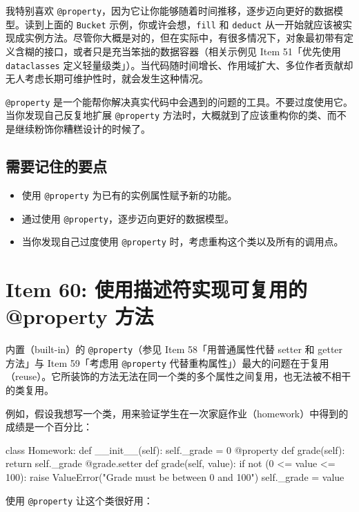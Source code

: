 我特别喜欢 \texttt{@property}，因为它让你能够随着时间推移，逐步迈向更好的数据模型。读到上面的 \texttt{Bucket} 示例，你或许会想，\texttt{fill} 和 \texttt{deduct} 从一开始就应该被实现成实例方法。尽管你大概是对的，但在实际中，有很多情况下，对象最初带有定义含糊的接口，或者只是充当笨拙的数据容器（相关示例见 Item 51「优先使用 \texttt{dataclasses} 定义轻量级类」）。当代码随时间增长、作用域扩大、多位作者贡献却无人考虑长期可维护性时，就会发生这种情况。

\texttt{@property} 是一个能帮你解决真实代码中会遇到的问题的工具。不要过度使用它。当你发现自己反复地扩展 \texttt{@property} 方法时，大概就到了应该重构你的类、而不是继续粉饰你糟糕设计的时候了。

\subsection{需要记住的要点}

\begin{itemize}
\item 使用 \texttt{@property} 为已有的实例属性赋予新的功能。
\item 通过使用 \texttt{@property}，逐步迈向更好的数据模型。
\item 当你发现自己过度使用 \texttt{@property} 时，考虑重构这个类以及所有的调用点。
\end{itemize}

\section{Item 60: 使用描述符实现可复用的 @property 方法}

内置（built-in）的 \texttt{@property}（参见 Item 58「用普通属性代替 setter 和 getter 方法」与 Item 59「考虑用 \texttt{@property} 代替重构属性」）最大的问题在于复用（reuse）。它所装饰的方法无法在同一个类的多个属性之间复用，也无法被不相干的类复用。

例如，假设我想写一个类，用来验证学生在一次家庭作业（homework）中得到的成绩是一个百分比：

\begin{codebox}[python]
class Homework:
    def __init__(self):
        self._grade = 0
    @property
    def grade(self):
        return self._grade
    @grade.setter
    def grade(self, value):
        if not (0 <= value <= 100):
            raise ValueError("Grade must be between 0 and 100")
        self._grade = value
\end{codebox}

使用 \texttt{@property} 让这个类很好用：

